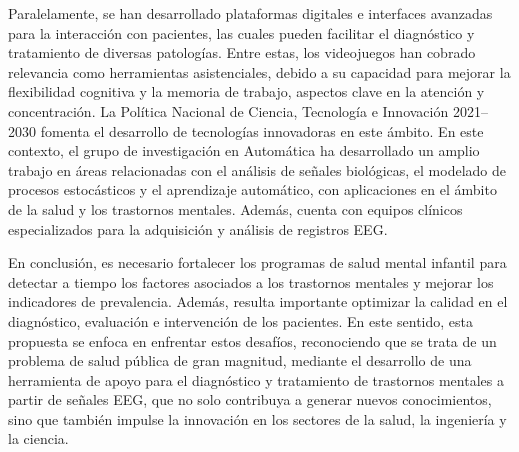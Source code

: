 Paralelamente, se han desarrollado plataformas digitales e interfaces avanzadas para la interacción con pacientes, las cuales pueden facilitar el diagnóstico y tratamiento de diversas patologías. Entre estas, los videojuegos han cobrado relevancia como herramientas asistenciales, debido a su capacidad para mejorar la flexibilidad cognitiva y la memoria de trabajo, aspectos clave en la atención y concentración. La Política Nacional de Ciencia, Tecnología e Innovación 2021–2030 fomenta el desarrollo de tecnologías innovadoras en este ámbito. En este contexto, el grupo de investigación en Automática ha desarrollado un amplio trabajo en áreas relacionadas con el análisis de señales biológicas, el modelado de procesos estocásticos y el aprendizaje automático, con aplicaciones en el ámbito de la salud y los trastornos mentales. Además, cuenta con equipos clínicos especializados para la adquisición y análisis de registros EEG.


En conclusión, es necesario fortalecer los programas de salud mental infantil para detectar a tiempo los factores asociados a los trastornos mentales y mejorar los indicadores de prevalencia. Además, resulta importante optimizar la calidad en el diagnóstico, evaluación e intervención de los pacientes. En este sentido, esta propuesta se enfoca en enfrentar estos desafíos, reconociendo que se trata de un problema de salud pública de gran magnitud, mediante el desarrollo de una herramienta de apoyo para el diagnóstico y tratamiento de trastornos mentales a partir de señales EEG, que no solo contribuya a generar nuevos conocimientos, sino que también impulse la innovación en los sectores de la salud, la ingeniería y la ciencia.
